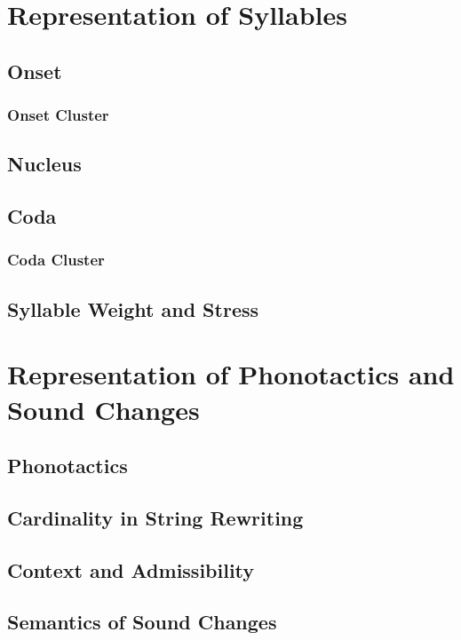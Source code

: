 \documentclass{report}
\begin{document}
\chapter{Representation of Syllables}

\section{Onset}

\subsection{Onset Cluster}

\section{Nucleus}

\section{Coda}

\subsection{Coda Cluster}

\section{Syllable Weight and Stress}

\chapter{Representation of Phonotactics and Sound Changes}

\section{Phonotactics}

\section{Cardinality in String Rewriting}

\section{Context and Admissibility}

\section{Semantics of Sound Changes}
\end{document}
